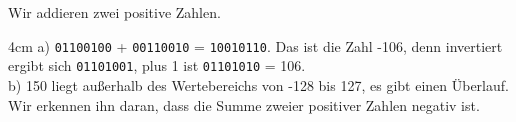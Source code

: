 \question[4]
Wir addieren zwei positive Zahlen.
\begin{solutionbox}{4cm}
a) \texttt{01100100} + \texttt{00110010} = \texttt{10010110}. Das ist die Zahl -106, denn invertiert ergibt sich \texttt{01101001}, plus 1 ist \texttt{01101010} = 106. \\
b) 150 liegt außerhalb des Wertebereichs von -128 bis 127, es gibt einen Überlauf. Wir erkennen ihn daran, dass die Summe zweier positiver Zahlen negativ ist.
\end{solutionbox}
